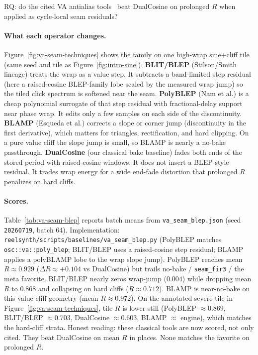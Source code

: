 RQ: do the cited VA antialias tools~\cite{stilson1996,nam2009polyblep,esqueda2016blamp} beat DualCosine on prolonged $R$ when applied as cycle-local seam residuals?

\paragraph{What each operator changes.}
Figure~\ref{fig:va-seam-techniques} shows the family on one high-wrap sine{+}cliff tile (same seed and tile as Figure~\ref{fig:intro-sine}).
\textbf{BLIT/BLEP} (Stilson/Smith lineage) treats the wrap as a value step.
It subtracts a band-limited step residual (here a raised-cosine BLEP-family lobe scaled by the measured wrap jump) so the tiled click spectrum is softened near the seam.
\textbf{PolyBLEP} (Nam et al.) is a cheap polynomial surrogate of that step residual with fractional-delay support near phase wrap.
It edits only a few samples on each side of the discontinuity.
\textbf{BLAMP} (Esqueda et al.) corrects a slope or corner jump (discontinuity in the first derivative), which matters for triangles, rectification, and hard clipping.
On a pure value cliff the slope jump is small, so BLAMP is nearly a no-bake passthrough.
\textbf{DualCosine} (our classical bake baseline) fades both ends of the stored period with raised-cosine windows.
It does not insert a BLEP-style residual. It trades wrap energy for a wide end-fade distortion that prolonged $R$ penalizes on hard cliffs.

\paragraph{Scores.}
Table~\ref{tab:va-seam-blep} reports batch means from \texttt{va\_seam\_blep.json} (seed \texttt{20260719}, batch 64).
Implementation: \texttt{reelsynth/scripts/baselines/va\_seam\_blep.py} (PolyBLEP matches \texttt{osc::va::poly\_blep}; BLIT/BLEP uses a raised-cosine step residual; BLAMP applies a polyBLAMP lobe to the wrap slope jump).
PolyBLEP reaches mean $R\approx 0.929$ ($\Delta R\approx{+}0.104$ vs DualCosine) but trails no-bake / \texttt{seam\_fir3} / the meta favorite.
BLIT/BLEP nearly zeros wrap-jump ($0.004$) while dropping mean $R$ to $0.868$ and collapsing on hard cliffs ($R\approx 0.712$).
BLAMP is near-no-bake on this value-cliff geometry (mean $R\approx 0.972$).
On the annotated severe tile in Figure~\ref{fig:va-seam-techniques}, tile $R$ is lower still (PolyBLEP $\approx 0.869$, BLIT/BLEP $\approx 0.703$, DualCosine $\approx 0.603$, BLAMP $\approx$ engine), which matches the hard-cliff strata.
Honest reading: these classical tools are now scored, not only cited.
They beat DualCosine on mean $R$ in places.
None matches the favorite on prolonged $R$.

